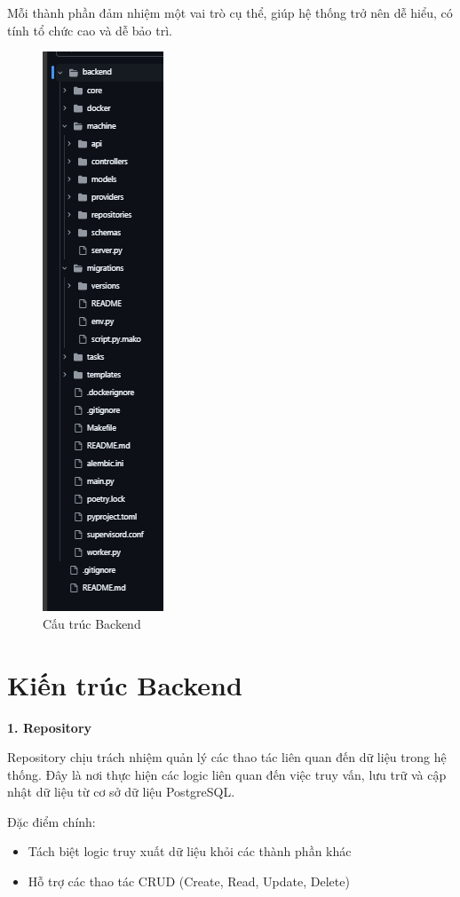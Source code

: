 Mỗi thành phần đảm nhiệm một vai trò cụ thể, giúp hệ thống trở nên dễ hiểu, có tính tổ chức cao và dễ bảo trì.

\begin{figure}[H]
    \centering
    \includegraphics[scale=0.5]{Images/Implement/backendStructure.png}
    \caption{Cấu trúc Backend}
\end{figure}

\section{Kiến trúc Backend}

\textbf{1. Repository} 

Repository chịu trách nhiệm quản lý các thao tác liên quan đến dữ liệu trong hệ thống. Đây là nơi thực hiện các logic liên quan đến việc truy vấn, lưu trữ và cập nhật dữ liệu từ cơ sở dữ liệu PostgreSQL.

Đặc điểm chính:

\begin{itemize}
    \item Tách biệt logic truy xuất dữ liệu khỏi các thành phần khác
    \item Hỗ trợ các thao tác CRUD (Create, Read, Update, Delete)
\end{itemize}

